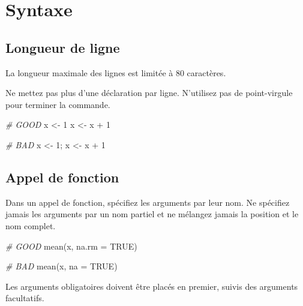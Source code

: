 \documentclass[
  french,
]{scrbook}
\newenvironment{Shaded}{\begin{snugshade}}{\end{snugshade}}
\newcommand{\AttributeTok}[1]{\textcolor[rgb]{0.77,0.63,0.00}{#1}}
\newcommand{\CommentTok}[1]{\textcolor[rgb]{0.56,0.35,0.01}{\textit{#1}}}
\newcommand{\ConstantTok}[1]{\textcolor[rgb]{0.00,0.00,0.00}{#1}}
\newcommand{\DecValTok}[1]{\textcolor[rgb]{0.00,0.00,0.81}{#1}}
\newcommand{\FunctionTok}[1]{\textcolor[rgb]{0.00,0.00,0.00}{#1}}
\newcommand{\NormalTok}[1]{#1}
\newcommand{\OtherTok}[1]{\textcolor[rgb]{0.56,0.35,0.01}{#1}}
\newcommand{\SpecialCharTok}[1]{\textcolor[rgb]{0.00,0.00,0.00}{#1}}
\begin{document}
\hypertarget{style-syntax}{%
\section{Syntaxe}\label{style-syntax}}

\hypertarget{longueur-de-ligne}{%
\subsection{Longueur de ligne}\label{longueur-de-ligne}}

La longueur maximale des lignes est limitée à 80 caractères.

Ne mettez pas plus d'une déclaration par ligne. N'utilisez pas de point-virgule pour terminer la commande.

\begin{Shaded}
\begin{Highlighting}[]
\CommentTok{\# GOOD}
\NormalTok{x }\OtherTok{\textless{}{-}} \DecValTok{1}
\NormalTok{x }\OtherTok{\textless{}{-}}\NormalTok{ x }\SpecialCharTok{+} \DecValTok{1}

\CommentTok{\# BAD }
\NormalTok{x }\OtherTok{\textless{}{-}} \DecValTok{1}\NormalTok{; x }\OtherTok{\textless{}{-}}\NormalTok{ x }\SpecialCharTok{+} \DecValTok{1}
\end{Highlighting}
\end{Shaded}

\hypertarget{style-fonction}{%
\subsection{Appel de fonction}\label{style-fonction}}

Dans un appel de fonction, spécifiez les arguments par leur nom. Ne spécifiez jamais les arguments par un nom partiel et ne mélangez jamais la position et le nom complet.

\begin{Shaded}
\begin{Highlighting}[]
\CommentTok{\# GOOD}
\FunctionTok{mean}\NormalTok{(x, }\AttributeTok{na.rm =} \ConstantTok{TRUE}\NormalTok{)}

\CommentTok{\# BAD}
\FunctionTok{mean}\NormalTok{(x, }\AttributeTok{na =} \ConstantTok{TRUE}\NormalTok{)}
\end{Highlighting}
\end{Shaded}

Les arguments obligatoires doivent être placés en premier, suivis des arguments facultatifs.
\end{document}
